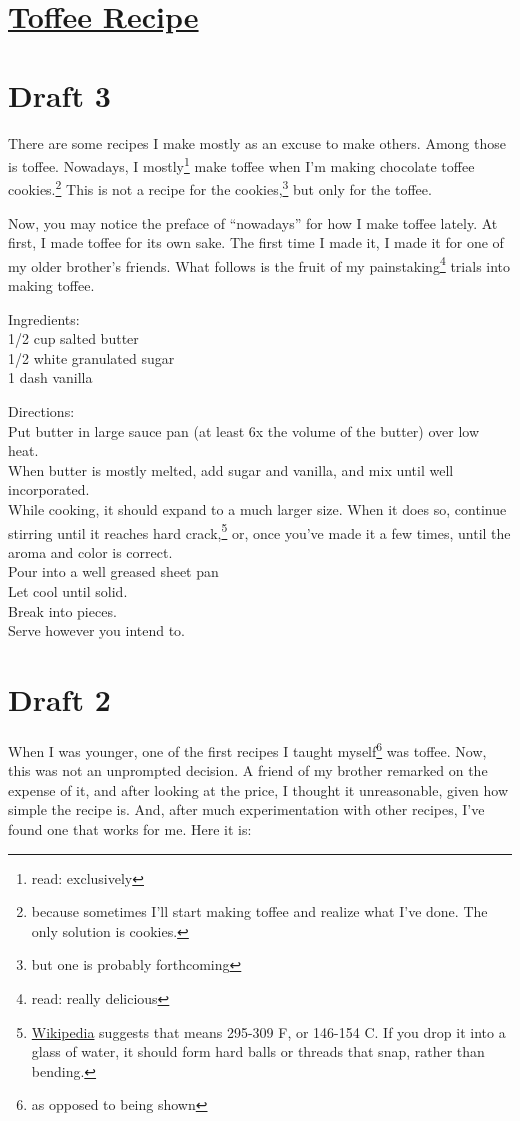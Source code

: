 \documentclass[12pt]{article}[titlepage]
\newcommand{\say}[1]{``#1''}
\newcommand{\1}{\={a}}
\newcommand{\2}{\={e}}
\newcommand{\3}{\={\i}}
\newcommand{\4}{\=o}
\newcommand{\5}{\=u}
\newcommand{\6}{\={A}}
\renewcommand{\,}{\textsuperscript{,}}
\begin{document}
\doublespacing
\section{\href{toffee-recipe.html}{Toffee Recipe}}
\section{Draft 3}
There are some recipes I make mostly as an excuse to make others.
Among those is toffee.
Nowadays, I mostly\footnote{read: exclusively} make toffee when I'm making chocolate toffee cookies.\footnote{because sometimes I'll start making toffee and realize what I've done. The only solution is cookies.}
This is not a recipe for the cookies,\footnote{but one is probably forthcoming} but only for the toffee.

Now, you may notice the preface of \say{nowadays} for how I make toffee lately.
At first, I made toffee for its own sake.
The first time I made it, I made it for one of my older brother's friends.
What follows is the fruit of my painstaking\footnote{read: really delicious} trials into making toffee.

Ingredients:\\
1/2 cup salted butter\\
1/2 white granulated sugar\\
1 dash vanilla

Directions:\\
Put butter in large sauce pan (at least 6x the volume of the butter) over low heat.\\
When butter is mostly melted, add sugar and vanilla, and mix until well incorporated.\\
While cooking, it should expand to a much larger size.
When it does so, continue stirring until it reaches hard crack,\footnote{\href{https://en.wikipedia.org/wiki/Candy_making}{Wikipedia} suggests that means 295-309 F, or 146-154 C. If you drop it into a glass of water, it should form hard balls or threads that snap, rather than bending.} or, once you've made it a few times, until the aroma and color is correct.\\
Pour into a well greased sheet pan\\
Let cool until solid.\\
Break into pieces.\\
Serve however you intend to.

\section{Draft 2}
When I was younger, one of the first recipes I taught myself\footnote{as opposed to being shown} was toffee.
Now, this was not an unprompted decision.
A friend of my brother remarked on the expense of it, and after looking at the price, I thought it unreasonable, given how simple the recipe is.
And, after much experimentation with other recipes, I've found one that works for me.
Here it is:
\end{document}

